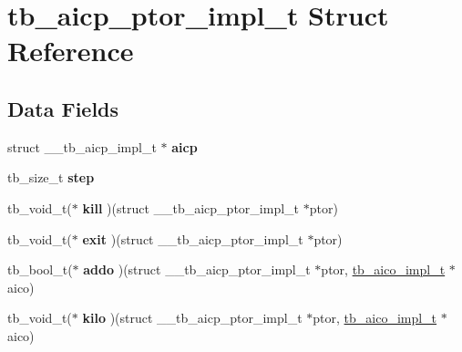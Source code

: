 \hypertarget{structtb__aicp__ptor__impl__t}{\section{tb\-\_\-aicp\-\_\-ptor\-\_\-impl\-\_\-t Struct Reference}
\label{structtb__aicp__ptor__impl__t}
}
\subsection*{Data Fields}
\begin{DoxyCompactItemize}
\item 
\hypertarget{structtb__aicp__ptor__impl__t_a673895a4531a540c9c7a885dd5a11ded}{struct \-\_\-\-\_\-tb\-\_\-aicp\-\_\-impl\-\_\-t $\ast$ {\bfseries aicp}}\label{structtb__aicp__ptor__impl__t_a673895a4531a540c9c7a885dd5a11ded}

\item 
\hypertarget{structtb__aicp__ptor__impl__t_aecca17cc6510e7d504c839837a3004c1}{tb\-\_\-size\-\_\-t {\bfseries step}}\label{structtb__aicp__ptor__impl__t_aecca17cc6510e7d504c839837a3004c1}

\item 
\hypertarget{structtb__aicp__ptor__impl__t_a1cf66f1248121a43636ccf11a14c4ffc}{tb\-\_\-void\-\_\-t($\ast$ {\bfseries kill} )(struct \-\_\-\-\_\-tb\-\_\-aicp\-\_\-ptor\-\_\-impl\-\_\-t $\ast$ptor)}\label{structtb__aicp__ptor__impl__t_a1cf66f1248121a43636ccf11a14c4ffc}

\item 
\hypertarget{structtb__aicp__ptor__impl__t_aceda8c1ea2b70a4634589f99544fe678}{tb\-\_\-void\-\_\-t($\ast$ {\bfseries exit} )(struct \-\_\-\-\_\-tb\-\_\-aicp\-\_\-ptor\-\_\-impl\-\_\-t $\ast$ptor)}\label{structtb__aicp__ptor__impl__t_aceda8c1ea2b70a4634589f99544fe678}

\item 
\hypertarget{structtb__aicp__ptor__impl__t_ae6341a9391773f982a345a2c1ee092e4}{tb\-\_\-bool\-\_\-t($\ast$ {\bfseries addo} )(struct \-\_\-\-\_\-tb\-\_\-aicp\-\_\-ptor\-\_\-impl\-\_\-t $\ast$ptor, \hyperlink{structtb__aico__impl__t}{tb\-\_\-aico\-\_\-impl\-\_\-t} $\ast$aico)}\label{structtb__aicp__ptor__impl__t_ae6341a9391773f982a345a2c1ee092e4}

\item 
\hypertarget{structtb__aicp__ptor__impl__t_ae17d4bc5dbb056d1d2d5cf8570149bde}{tb\-\_\-void\-\_\-t($\ast$ {\bfseries kilo} )(struct \-\_\-\-\_\-tb\-\_\-aicp\-\_\-ptor\-\_\-impl\-\_\-t $\ast$ptor, \hyperlink{structtb__aico__impl__t}{tb\-\_\-aico\-\_\-impl\-\_\-t} $\ast$aico)}\label{structtb__aicp__ptor__impl__t_ae17d4bc5dbb056d1d2d5cf8570149bde}


\end{DoxyCompactItemize}
